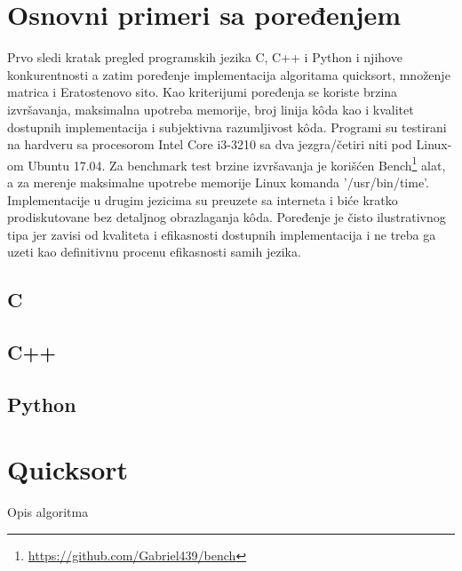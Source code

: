 \documentclass[12pt,oneside]{memoir}
\begin{document}
\section{Osnovni primeri sa poređenjem}
Prvo sledi kratak pregled programskih jezika C, C++ i Python i njihove konkurentnosti a zatim poređenje implementacija algoritama quicksort, množenje matrica i Eratostenovo sito. Kao kriterijumi poređenja se koriste brzina izvršavanja, maksimalna upotreba memorije, broj linija k\^{o}da kao i kvalitet dostupnih implementacija i subjektivna razumljivost  k\^{o}da. Programi su testirani na hardveru sa procesorom Intel Core i3-3210 sa dva jezgra/četiri niti pod Linux-om Ubuntu 17.04. Za benchmark test brzine izvršavanja je korišćen Bench\footnote{\url{https://github.com/Gabriel439/bench}} alat, a za merenje maksimalne upotrebe memorije Linux komanda '/usr/bin/time'. Implementacije u drugim jezicima su preuzete sa interneta i biće kratko prodiskutovane bez detaljnog obrazlaganja k\^{o}da. Poređenje je čisto ilustrativnog tipa jer zavisi od kvaliteta i efikasnosti dostupnih implementacija i ne treba ga uzeti kao definitivnu procenu efikasnosti samih jezika. 

\subsection{C}

\subsection{C++}

\subsection{Python}

\section{Quicksort}
Opis algoritma
\end{document}
